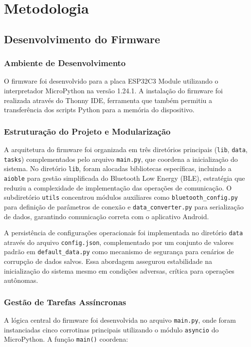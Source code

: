 \chapter[Metodologia]{Metodologia}

\section{Desenvolvimento do Firmware}
\subsection{Ambiente de Desenvolvimento}
O firmware foi desenvolvido para a placa ESP32C3 Module utilizando o interpretador MicroPython na versão 1.24.1. A instalação do firmware foi realizada através do Thonny IDE, ferramenta que também permitiu a transferência dos scripts Python para a memória do dispositivo.

\subsection{Estruturação do Projeto e Modularização}
A arquitetura do firmware foi organizada em três diretórios principais (\texttt{lib}, \texttt{data}, \texttt{tasks}) complementados pelo arquivo \texttt{main.py}, que coordena a inicialização do sistema. No diretório \texttt{lib}, foram alocadas bibliotecas específicas, incluindo a \texttt{aioble} para gestão simplificada do Bluetooth Low Energy (BLE), estratégia que reduziu a complexidade de implementação das operações de comunicação. O subdiretório \texttt{utils} concentrou módulos auxiliares como \texttt{bluetooth\_config.py} para definição de parâmetros de conexão e \texttt{data\_converter.py} para serialização de dados, garantindo comunicação correta com o aplicativo Android.

A persistência de configurações operacionais foi implementada no diretório \texttt{data} através do arquivo \texttt{config.json}, complementado por um conjunto de valores padrão em \texttt{default\_data.py} como mecanismo de segurança para cenários de corrupção de dados salvos. Essa abordagem assegurou estabilidade na inicialização do sistema mesmo em condições adversas, crítica para operações autônomas.

\subsection{Gestão de Tarefas Assíncronas}
A lógica central do firmware foi desenvolvida no arquivo \texttt{main.py}, onde foram instanciadas cinco corrotinas principais utilizando o módulo \texttt{asyncio} do MicroPython. A função \texttt{main()} coordena:

